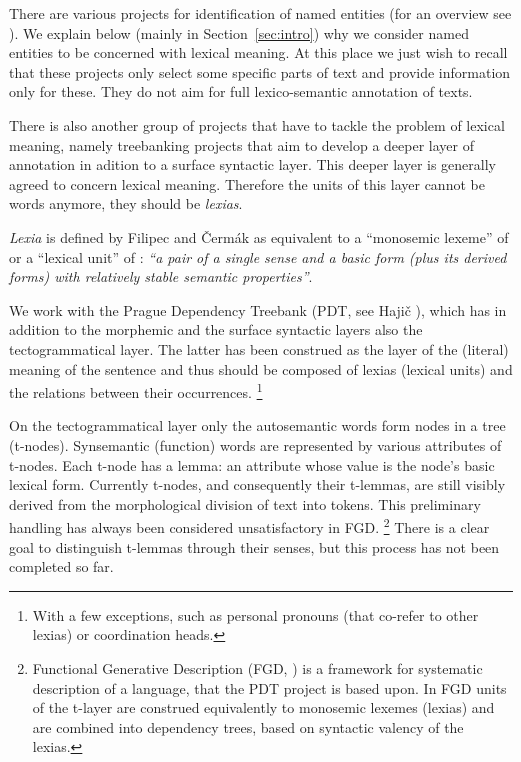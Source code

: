 \documentclass[11pt]{article}
\begin{document}
There are various projects for identification of na\-med entities (for an overview see \cite{sevcikova:2007}). We explain below (mainly in Section~\ref{sec:intro}) why we consider named entities to be concerned with lexical meaning. At this place we just wish to recall that these projects only select some specific parts of text and provide information only for these. They do not aim for full lexico-semantic annotation of texts.

There is also another group of projects that have to tackle the problem of lexical meaning, namely treebanking projects that aim to develop a deeper layer of annotation in adition to a surface syntactic layer. This deeper layer is generally agreed to concern lexical meaning. Therefore the units of this layer cannot be words anymore, they should be \textit{lexias}. 

\textit{Lexia} is defined by Filipec and Čermák  as equivalent to a ``monosemic lexeme'' of \cite{filipec:1994} or a ``lexical unit'' of \cite{cruse:1986}: \textit{``a pair of a single sense and a basic form (plus its derived forms) with relatively stable semantic properties''}. 

We work with the Prague Dependency Treebank (PDT, see Hajič ), which has in addition to the morphemic and the surface syntactic layers also the tectogrammatical layer. The latter has been construed as the layer of the (literal) meaning of the sentence and thus should be composed of lexias (lexical units) and the relations between their occurrences.%
\footnote{With a few exceptions, such as personal pronouns (that co-refer to other lexias) or coordination heads.}

On the tectogrammatical layer only the autosemantic words form nodes in a tree (t-nodes). Synsemantic (function) words are represented by various attributes of t-nodes. Each t-node has a lemma: an attribute whose value is the node's basic lexical form.
Currently t-nodes, and consequently their t-lemmas, are still visibly derived from the morphological division of text into tokens. This preliminary handling has always been considered unsatisfactory in FGD.%
\footnote{Functional Generative Description (FGD, \cite{sgall-etal:1986,hajicova:1998}) is a framework for systematic description of a language, that the PDT project is based upon. In FGD units of the t-layer are construed equivalently to monosemic lexemes (lexias) and are combined into dependency trees, based on syntactic valency of the lexias.}
There is a clear goal to distinguish t-lemmas through their senses, but %
this process has not been completed so far.
\end{document}
